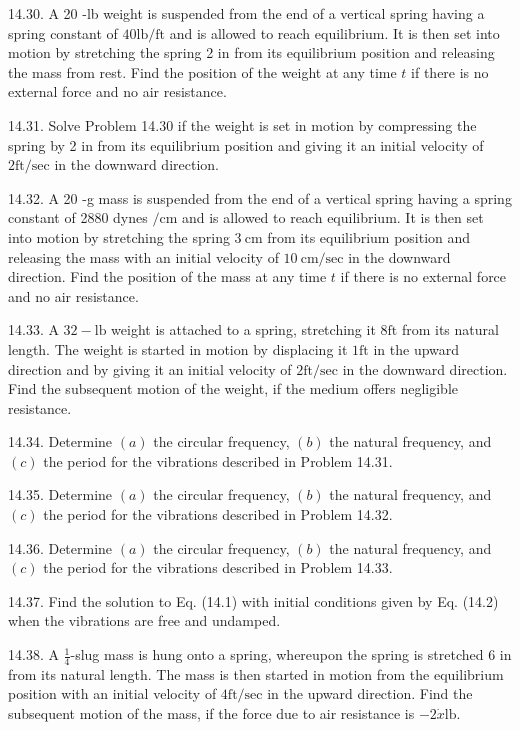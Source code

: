\documentclass[10pt]{article}
\begin{document}
14.30. A 20 -lb weight is suspended from the end of a vertical spring having a spring constant of $40 \mathrm{lb} / \mathrm{ft}$ and is allowed to reach equilibrium. It is then set into motion by stretching the spring 2 in from its equilibrium position and releasing the mass from rest. Find the position of the weight at any time $t$ if there is no external force and no air resistance.

14.31. Solve Problem 14.30 if the weight is set in motion by compressing the spring by 2 in from its equilibrium position and giving it an initial velocity of $2 \mathrm{ft} / \mathrm{sec}$ in the downward direction.

14.32. A 20 -g mass is suspended from the end of a vertical spring having a spring constant of 2880 dynes $/ \mathrm{cm}$ and is allowed to reach equilibrium. It is then set into motion by stretching the spring $3 \mathrm{~cm}$ from its equilibrium position and releasing the mass with an initial velocity of $10 \mathrm{~cm} / \mathrm{sec}$ in the downward direction. Find the position of the mass at any time $t$ if there is no external force and no air resistance.

14.33. A $32-\mathrm{lb}$ weight is attached to a spring, stretching it $8 \mathrm{ft}$ from its natural length. The weight is started in motion by displacing it $1 \mathrm{ft}$ in the upward direction and by giving it an initial velocity of $2 \mathrm{ft} / \mathrm{sec}$ in the downward direction. Find the subsequent motion of the weight, if the medium offers negligible resistance.

14.34. Determine $(a)$ the circular frequency, $(b)$ the natural frequency, and $(c)$ the period for the vibrations described in Problem 14.31.

14.35. Determine $(a)$ the circular frequency, $(b)$ the natural frequency, and $(c)$ the period for the vibrations described in Problem 14.32.

14.36. Determine $(a)$ the circular frequency, $(b)$ the natural frequency, and $(c)$ the period for the vibrations described in Problem 14.33.

14.37. Find the solution to Eq. (14.1) with initial conditions given by Eq. (14.2) when the vibrations are free and undamped.

14.38. A $\frac{1}{4}$-slug mass is hung onto a spring, whereupon the spring is stretched 6 in from its natural length. The mass is then started in motion from the equilibrium position with an initial velocity of $4 \mathrm{ft} / \mathrm{sec}$ in the upward direction. Find the subsequent motion of the mass, if the force due to air resistance is $-2 \dot{x} \mathrm{lb}$.
\end{document}

